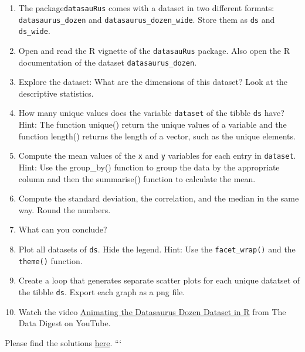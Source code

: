 \documentclass[
  12pt,
  oneside]{book}
\theoremstyle{definition}
\theoremstyle{definition}
\theoremstyle{definition}
\theoremstyle{definition}
\theoremstyle{remark}
\begin{document}
\begin{enumerate}
\def\labelenumi{\alph{enumi})}
\setcounter{enumi}{1}
\item
  The package\texttt{datasauRus} comes with a dataset in two different formats: \texttt{datasaurus\_dozen} and \texttt{datasaurus\_dozen\_wide}. Store them as \texttt{ds} and \texttt{ds\_wide}.
\item
  Open and read the R vignette of the \texttt{datasauRus} package. Also open the R documentation of the dataset \texttt{datasaurus\_dozen}.
\item
  Explore the dataset: What are the dimensions of this dataset? Look at the descriptive statistics.
\item
  How many unique values does the variable \texttt{dataset} of the tibble \texttt{ds} have? Hint: The function unique() return the unique values of a variable and the function length() returns the length of a vector, such as the unique elements.
\item
  Compute the mean values of the \texttt{x} and \texttt{y} variables for each entry in \texttt{dataset}. Hint: Use the group\_by() function to group the data by the appropriate column and then the summarise() function to calculate the mean.
\item
  Compute the standard deviation, the correlation, and the median in the same way. Round the numbers.
\item
  What can you conclude?
\item
  Plot all datasets of \texttt{ds}. Hide the legend. Hint: Use the \texttt{facet\_wrap()} and the \texttt{theme()} function.
\item
  Create a loop that generates separate scatter plots for each unique datatset of the tibble \texttt{ds}. Export each graph as a png file.
\item
  Watch the video \href{https://youtu.be/T-kxUB29t0o}{Animating the Datasaurus Dozen Dataset in R} from The Data Digest on YouTube.
\end{enumerate}

Please find the solutions \href{https://htmlpreview.github.io/?https://raw.githubusercontent.com/hubchev/hubchev.github.io/main/various/datasaurus_solution.html}{here}.
```
\end{document}
